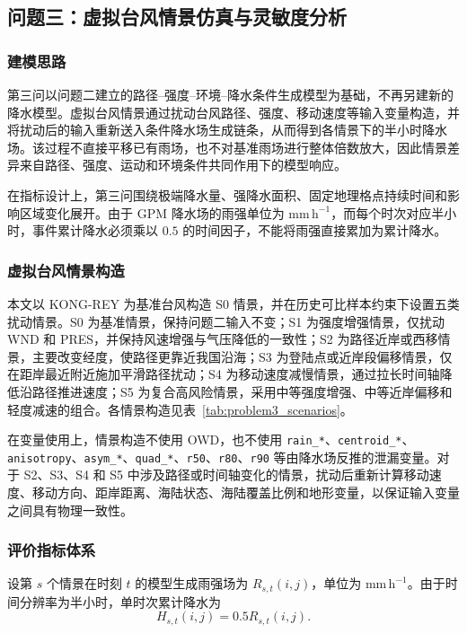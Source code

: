 \subsection{问题三：虚拟台风情景仿真与灵敏度分析}

\subsubsection{建模思路}

第三问以问题二建立的路径--强度--环境--降水条件生成模型为基础，不再另建新的降水模型。虚拟台风情景通过扰动台风路径、强度、移动速度等输入变量构造，并将扰动后的输入重新送入条件降水场生成链条，从而得到各情景下的半小时降水场。该过程不直接平移已有雨场，也不对基准雨场进行整体倍数放大，因此情景差异来自路径、强度、运动和环境条件共同作用下的模型响应。

在指标设计上，第三问围绕极端降水量、强降水面积、固定地理格点持续时间和影响区域变化展开。由于 GPM 降水场的雨强单位为 $\mathrm{mm\,h^{-1}}$，而每个时次对应半小时，事件累计降水必须乘以 $0.5$ 的时间因子，不能将雨强直接累加为累计降水。

\subsubsection{虚拟台风情景构造}

本文以 KONG-REY 为基准台风构造 S0 情景，并在历史可比样本约束下设置五类扰动情景。S0 为基准情景，保持问题二输入不变；S1 为强度增强情景，仅扰动 WND 和 PRES，并保持风速增强与气压降低的一致性；S2 为路径近岸或西移情景，主要改变经度，使路径更靠近我国沿海；S3 为登陆点或近岸段偏移情景，仅在距岸最近附近施加平滑路径扰动；S4 为移动速度减慢情景，通过拉长时间轴降低沿路径推进速度；S5 为复合高风险情景，采用中等强度增强、中等近岸偏移和轻度减速的组合。各情景构造见表~\ref{tab:problem3_scenarios}。

在变量使用上，情景构造不使用 OWD，也不使用 \verb|rain_*|、\verb|centroid_*|、\verb|anisotropy|、\verb|asym_*|、\verb|quad_*|、\verb|r50|、\verb|r80|、\verb|r90| 等由降水场反推的泄漏变量。对于 S2、S3、S4 和 S5 中涉及路径或时间轴变化的情景，扰动后重新计算移动速度、移动方向、距岸距离、海陆状态、海陆覆盖比例和地形变量，以保证输入变量之间具有物理一致性。

\subsubsection{评价指标体系}

设第 $s$ 个情景在时刻 $t$ 的模型生成雨强场为 $R_{s,t}(i,j)$，单位为 $\mathrm{mm\,h^{-1}}$。由于时间分辨率为半小时，单时次累计降水为
\begin{equation}
H_{s,t}(i,j)=0.5R_{s,t}(i,j).
\end{equation}

